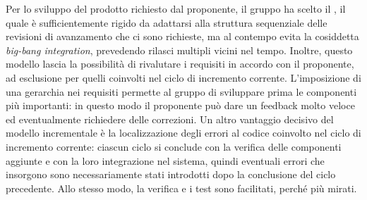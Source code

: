 \documentclass[../piano-di-progetto.tex]{subfiles}
\begin{document}
Per lo sviluppo del prodotto richiesto dal proponente, il gruppo ha scelto il , il quale è sufficientemente rigido da adattarsi alla struttura sequenziale delle revisioni di avanzamento che ci sono richieste, ma al contempo evita la cosiddetta \textit{big-bang integration}, prevedendo rilasci multipli vicini nel tempo.
Inoltre, questo modello lascia la possibilità di rivalutare i requisiti in accordo con il proponente, ad esclusione per quelli coinvolti nel ciclo di incremento corrente.
L'imposizione di una gerarchia nei requisiti permette al gruppo di sviluppare prima le componenti più importanti: in questo modo il proponente può dare un feedback molto veloce ed eventualmente richiedere delle correzioni.
Un altro vantaggio decisivo del modello incrementale è la localizzazione degli errori al codice coinvolto nel ciclo di incremento corrente: ciascun ciclo si conclude con la verifica delle componenti aggiunte e con la loro integrazione nel sistema, quindi eventuali errori che insorgono sono necessariamente stati introdotti dopo la conclusione del ciclo precedente.
Allo stesso modo, la verifica e i test sono facilitati, perché più mirati.
\end{document}
